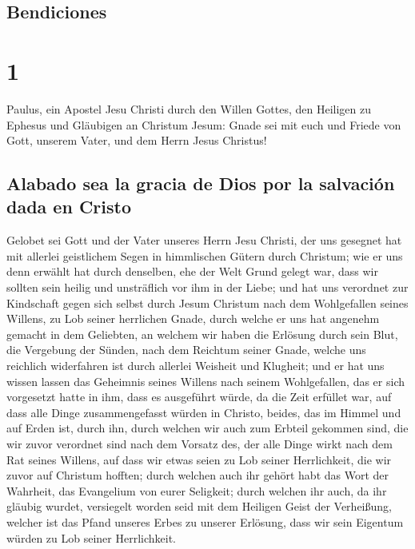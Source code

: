 \hypertarget{bendiciones}{%
\subsection{Bendiciones}\label{bendiciones}}

\hypertarget{section}{%
\section{1}\label{section}}

 Paulus, ein Apostel Jesu Christi durch den Willen Gottes,
den Heiligen zu Ephesus und Gläubigen an Christum Jesum: 
Gnade sei mit euch und Friede von Gott, unserem Vater, und dem Herrn
Jesus Christus!

\hypertarget{alabado-sea-la-gracia-de-dios-por-la-salvaciuxf3n-dada-en-cristo}{%
\subsection{Alabado sea la gracia de Dios por la salvación dada en
Cristo}\label{alabado-sea-la-gracia-de-dios-por-la-salvaciuxf3n-dada-en-cristo}}

 Gelobet sei Gott und der Vater unseres Herrn Jesu
Christi, der uns gesegnet hat mit allerlei geistlichem Segen in
himmlischen Gütern durch Christum;  wie er uns denn
erwählt hat durch denselben, ehe der Welt Grund gelegt war, dass wir
sollten sein heilig und unsträflich vor ihm in der Liebe; 
und hat uns verordnet zur Kindschaft gegen sich selbst durch Jesum
Christum nach dem Wohlgefallen seines Willens,  zu Lob
seiner herrlichen Gnade, durch welche er uns hat angenehm gemacht in dem
Geliebten,  an welchem wir haben die Erlösung durch sein
Blut, die Vergebung der Sünden, nach dem Reichtum seiner Gnade,
 welche uns reichlich widerfahren ist durch allerlei
Weisheit und Klugheit;  und er hat uns wissen lassen das
Geheimnis seines Willens nach seinem Wohlgefallen, das er sich
vorgesetzt hatte in ihm,  dass es ausgeführt würde, da
die Zeit erfüllet war, auf dass alle Dinge zusammengefasst würden in
Christo, beides, das im Himmel und auf Erden ist, durch ihn,
 durch welchen wir auch zum Erbteil gekommen sind, die
wir zuvor verordnet sind nach dem Vorsatz des, der alle Dinge wirkt nach
dem Rat seines Willens,  auf dass wir etwas seien zu Lob
seiner Herrlichkeit, die wir zuvor auf Christum hofften; 
durch welchen auch ihr gehört habt das Wort der Wahrheit, das Evangelium
von eurer Seligkeit; durch welchen ihr auch, da ihr gläubig wurdet,
versiegelt worden seid mit dem Heiligen Geist der Verheißung,
 welcher ist das Pfand unseres Erbes zu unserer Erlösung,
dass wir sein Eigentum würden zu Lob seiner Herrlichkeit.

